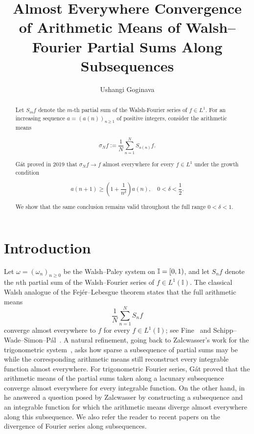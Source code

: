 \documentclass[11pt]{amsart}
\numberwithin{equation}{section}
\theoremstyle{remark}
\begin{document}
\title[Arithmetic means of Walsh--Fourier partial sums]{Almost Everywhere
Convergence of Arithmetic Means of Walsh--Fourier Partial Sums Along
Subsequences}
\author{ Ushangi Goginava}
\address{U. Goginava, Department of Mathematical Sciences \\
	United Arab Emirates University, P.O. Box No. 15551\\
	Al Ain, Abu Dhabi, UAE}
\date{}

\begin{abstract}
Let $S_m f$ denote the $m$-th partial sum of the Walsh-Fourier series of $f \in L^1$. For an increasing sequence $a=(a(n))_{n \geq 1}$ of positive integers, consider the arithmetic means

$$
\sigma_N f:=\frac{1}{N} \sum_{n=1}^N S_{a(n)} f .
$$


Gát proved in 2019 that $\sigma_N f \rightarrow f$ almost everywhere for every $f \in L^1$ under the growth condition

$$
a(n+1) \geq\left(1+\frac{1}{n^\delta}\right) a(n), \quad 0<\delta<\frac{1}{2} .
$$


We show that the same conclusion remains valid throughout the full range $0<\delta<1$.
\end{abstract}

\maketitle

\section{Introduction}

Let $\omega =(\omega _{n})_{n\geq 0}$ be the Walsh--Paley system on $\mathbb{%
I}=[0,1)$, and let $S_{n}f$ denote the $n$th partial sum of the
Walsh--Fourier series of $f\in L^{1}(\mathbb{I})$. The classical Walsh
analogue of the Fej\'{e}r--Lebesgue theorem states that the full arithmetic
means 
\begin{equation*}
\frac{1}{N}\sum_{n=1}^{N}S_{n}f
\end{equation*}%
converge almost everywhere to $f$ for every $f\in L^{1}(\mathbb{I})$; see
Fine~\cite{Fine} and Schipp--Wade--Simon--P\'{a}l~\cite{SchippBook}. A
natural refinement, going back to Zalcwasser's work for the trigonometric
system~\cite{Zalcwasser}, asks how sparse a subsequence of partial sums may
be while the corresponding arithmetic means still reconstruct every
integrable function almost everywhere. For trigonometric Fourier series, G\'at 
\cite{GatConstr} proved that the arithmetic means of the partial sums taken
along a lacunary subsequence converge almost everywhere for every integrable
function. On the other hand, in \cite{GatAnn} he answered a question posed
by Zalcwasser  \cite{Zalcwasser} by constructing a subsequence and an
integrable function for which the arithmetic means diverge almost everywhere
along this subsequence. We also refer the reader to recent papers \cite%
{GogMukh,GogOniani} on the divergence of Fourier series along subsequences.
\end{document}
